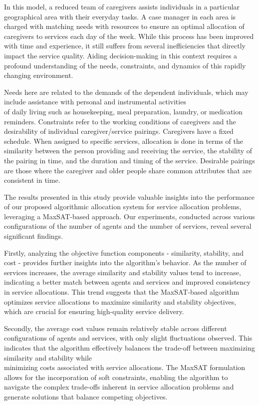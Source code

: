 \documentclass[10pt]{article}
\begin{document}
In this model, a reduced team of caregivers assists individuals in a particular geographical area with their everyday tasks. A case manager in each area is charged with matching needs with resources to ensure an optimal allocation of caregivers to services each day of the week. While this process has been improved with time and experience, it still suffers from several inefficiencies that directly impact the service quality. Aiding decision-making in this context requires a profound understanding of the needs, constraints, and dynamics of this rapidly changing environment.

Needs here are related to the demands of the dependent individuals, which may include assistance with personal and instrumental activities\\
of daily living such as housekeeping, meal preparation, laundry, or medication reminders. Constraints refer to the working conditions of caregivers and the desirability of individual caregiver/service pairings. Caregivers have a fixed schedule. When assigned to specific services, allocation is done in terms of the similarity between the person providing and receiving the service, the stability of the pairing in time, and the duration and timing of the service. Desirable pairings are those where the caregiver and older people share common attributes that are consistent in time.

The results presented in this study provide valuable insights into the performance of our proposed algorithmic allocation system for service allocation problems, leveraging a MaxSAT-based approach. Our experiments, conducted across various configurations of the number of agents and the number of services, reveal several significant findings.

Firstly, analyzing the objective function components - similarity, stability, and cost - provides further insights into the algorithm's behavior. As the number of services increases, the average similarity and stability values tend to increase, indicating a better match between agents and services and improved consistency in service allocations. This trend suggests that the MaxSAT-based algorithm optimizes service allocations to maximize similarity and stability objectives, which are crucial for ensuring high-quality service delivery.

Secondly, the average cost values remain relatively stable across different configurations of agents and services, with only slight fluctuations observed. This indicates that the algorithm effectively balances the trade-off between maximizing similarity and stability while\\
minimizing costs associated with service allocations. The MaxSAT formulation allows for the incorporation of soft constraints, enabling the algorithm to navigate the complex trade-offs inherent in service allocation problems and generate solutions that balance competing objectives.
\end{document}
